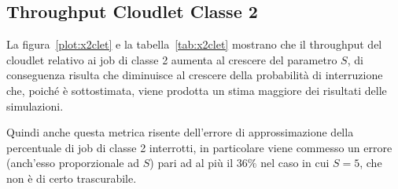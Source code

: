 \subsection{Throughput Cloudlet Classe 2}
La figura~\ref{plot:x2clet} e la tabella~\ref{tab:x2clet} mostrano che il
throughput del cloudlet relativo ai job di classe 2 aumenta al crescere del
parametro $S$, di conseguenza risulta che diminuisce al crescere della
probabilità di interruzione che, poiché è sottostimata, viene prodotta un stima
maggiore dei risultati delle simulazioni.

Quindi anche questa metrica risente dell'errore di approssimazione della
percentuale di job di classe 2 interrotti, in particolare viene commesso un
errore (anch'esso proporzionale ad $S$) pari ad al più il $36\%$ nel caso in cui
$S=5$, che non è di certo trascurabile.


